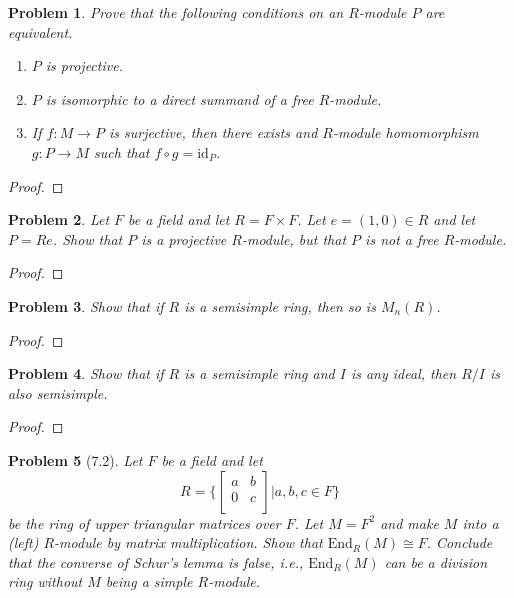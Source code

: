 \documentclass[10pt]{article}
\newcommand{\sk}{\vskip 10mm}
\newcommand{\id}{\mathrm{id}}
\theoremstyle{plain}
\newtheorem{problem}{Problem}
\theoremstyle{remark}
\begin{document}
\begin{problem}
  Prove that the following conditions on an $R$-module $P$ are equivalent.
  \begin{enumerate}
  \item[(a)] $P$ is projective.
  \item[(b)] $P$ is isomorphic to a direct summand of a free $R$-module.
  \item[(c)] If $f:M\rightarrow P$ is surjective, then there exists and
    $R$-module homomorphism $g:P\rightarrow M$ such that $f\circ g=\id_P$.
  \end{enumerate}
\end{problem}

\begin{proof}
  
\end{proof}

\sk

\begin{problem}
  Let $F$ be a field and let $R=F\times F$. Let $e=(1,0)\in R$ and let  $P=Re$.
  Show that $P$ is a projective $R$-module, but that $P$ is not a
  free $R$-module.
\end{problem}

\begin{proof}
  
\end{proof}

\sk

\begin{problem}
  Show that if $R$ is a semisimple ring, then so is $M_n(R)$.
\end{problem}

\begin{proof}
  
\end{proof}

\sk

\begin{problem}
  Show that if $R$ is a semisimple ring and $I$ is any ideal, then $R/I$
  is also semisimple.
\end{problem}

\begin{proof}
  
\end{proof}

\sk

\begin{problem}[7.2]
  Let $F$ be a field and let
  \[
    R =
    \{
    \left[
      \begin{array}{cc}
        a&b\\
        0&c\\
      \end{array}
    \right]
    |
    a,b,c\in F
    \}
  \]
  be the ring of upper triangular matrices over $F$. Let $M=F^2$ and make
$M$ into a (left) $R$-module by matrix multiplication. Show that
  $\text{End}_R(M)\cong F$. Conclude that the converse of Schur's lemma
  is false, i.e., $\text{End}_R(M)$ can be a division ring without
  $M$ being a simple $R$-module.
\end{problem}
\end{document}
